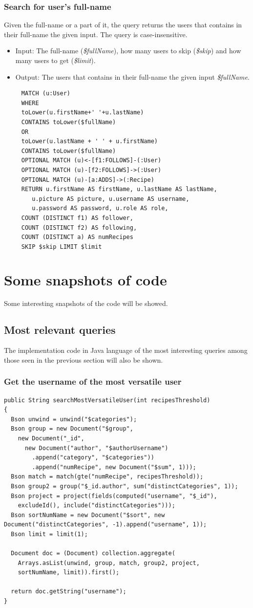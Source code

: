 \documentclass[a4paper]{report}
\begin{document}
\subsubsection{Search for user's full-name}
Given the full-name or a part of it, the query returns the users that contains in their full-name the given input. The query is case-insensitive.
\begin{itemize}
	\item Input: The full-name (\emph{\$fullName}), how many users to skip (\emph{\$skip}) and how many users to get (\emph{\$limit}).
	\item Output: The users that contains in their full-name the given input \emph{\$fullName}.
\end{itemize}
\begin{lstlisting}
	 MATCH (u:User) 
	 WHERE
	 toLower(u.firstName+' '+u.lastName)
	 CONTAINS toLower($fullName)
	 OR
	 toLower(u.lastName + ' ' + u.firstName)
	 CONTAINS toLower($fullName)
	 OPTIONAL MATCH (u)<-[f1:FOLLOWS]-(:User)
	 OPTIONAL MATCH (u)-[f2:FOLLOWS]->(:User)
	 OPTIONAL MATCH (u)-[a:ADDS]->(:Recipe)
	 RETURN u.firstName AS firstName, u.lastName AS lastName,
	 	u.picture AS picture, u.username AS username,
	 	u.password AS password, u.role AS role,
	 COUNT (DISTINCT f1) AS follower,
	 COUNT (DISTINCT f2) AS following,
	 COUNT (DISTINCT a) AS numRecipes
	 SKIP $skip LIMIT $limit
\end{lstlisting} 

\section {Some snapshots of code}
Some interesting snapshots of the code will be showed.
\subsection{Most relevant queries}
The implementation code in Java language of the most interesting queries among those seen in the previous section will also be shown.
\subsubsection{Get the username of the most versatile user}
\lstset{language=code}
\begin{lstlisting}
public String searchMostVersatileUser(int recipesThreshold)
{
  Bson unwind = unwind("$categories");
  Bson group = new Document("$group", 
    new Document("_id", 
      new Document("author", "$authorUsername")
        .append("category", "$categories"))
        .append("numRecipe", new Document("$sum", 1)));
  Bson match = match(gte("numRecipe", recipesThreshold));
  Bson group2 = group("$_id.author", sum("distinctCategories", 1));
  Bson project = project(fields(computed("username", "$_id"), 
    excludeId(), include("distinctCategories")));
  Bson sortNumName = new Document("$sort", new Document("distinctCategories", -1).append("username", 1));
  Bson limit = limit(1);

  Document doc = (Document) collection.aggregate(
    Arrays.asList(unwind, group, match, group2, project, 
    sortNumName, limit)).first();

  return doc.getString("username");
}	
\end{lstlisting} 
\end{document}
